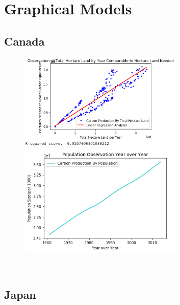 \documentclass[journal,onecolumn]{IEEEtran}
\begin{document}
\newpage

\appendices

\section{Graphical Models}

\subsection{\centering Canada}
     
     \begin{figure}[h]
	\centering
  	\includegraphics[width=0.7\textwidth]{img/Canada-Carbon.png}
  	  	\includegraphics[width=0.7\textwidth]{img/Canada-Population.png}
\end{figure}\\



\newpage

\subsection{\centering Japan}
     
\end{document}
